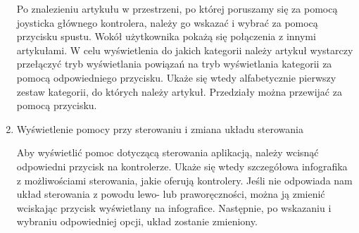 \begin{enumerate}
	Po znalezieniu artykułu w przestrzeni, po której poruszamy się za pomocą joysticka głównego kontrolera, należy go wskazać i wybrać za pomocą przycisku spustu. Wokół użytkownika pokażą się połączenia z innymi artykułami. W celu wyświetlenia do jakich kategorii należy artykuł wystarczy przełączyć tryb wyświetlania powiązań na tryb wyświetlania kategorii  za pomocą odpowiedniego przycisku. Ukaże się wtedy alfabetycznie pierwszy zestaw kategorii, do których należy artykuł. Przedziały można przewijać za pomocą przycisku.
	
\item Wyświetlenie pomocy przy sterowaniu i zmiana układu sterowania

	Aby wyświetlić pomoc dotyczącą sterowania aplikacją, należy wcisnąć odpowiedni przycisk na kontrolerze. Ukaże się wtedy szczegółowa infografika z możliwościami sterowania, jakie oferują kontrolery. Jeśli nie odpowiada nam układ sterowania z powodu lewo- lub praworęczności, można ją zmienić wciskając przycisk wyświetlany na infografice. Następnie, po wskazaniu i wybraniu odpowiedniej opcji, układ zostanie zmieniony.
\end{enumerate}
